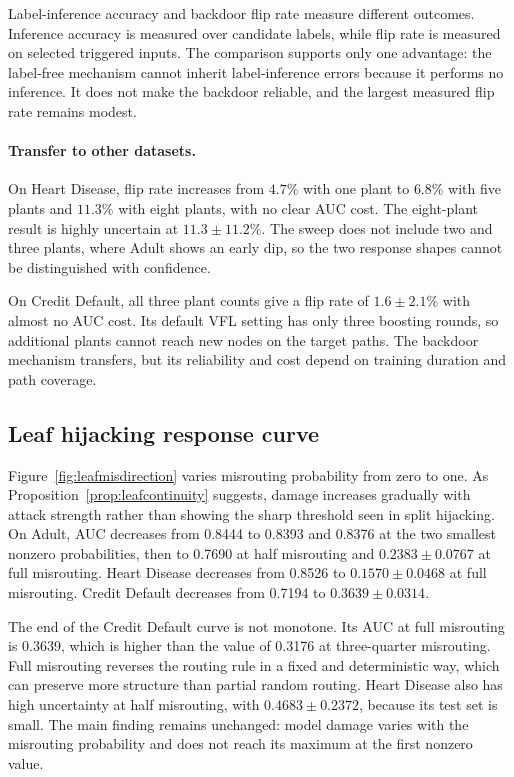 \documentclass[11pt]{article}
\begin{document}
Label-inference accuracy and backdoor flip rate measure different outcomes. Inference accuracy is measured over candidate labels, while flip rate is measured on selected triggered inputs. The comparison supports only one advantage: the label-free mechanism cannot inherit label-inference errors because it performs no inference. It does not make the backdoor reliable, and the largest measured flip rate remains modest.

\paragraph{Transfer to other datasets.}
On Heart Disease, flip rate increases from $4.7\%$ with one plant to $6.8\%$ with five plants and $11.3\%$ with eight plants, with no clear AUC cost. The eight-plant result is highly uncertain at $11.3\pm11.2\%$. The sweep does not include two and three plants, where Adult shows an early dip, so the two response shapes cannot be distinguished with confidence.

On Credit Default, all three plant counts give a flip rate of $1.6\pm2.1\%$ with almost no AUC cost. Its default VFL setting has only three boosting rounds, so additional plants cannot reach new nodes on the target paths. The backdoor mechanism transfers, but its reliability and cost depend on training duration and path coverage.

\FloatBarrier

\subsection{Leaf hijacking response curve}
\label{sec:leafresults}

Figure~\ref{fig:leafmisdirection} varies misrouting probability from zero to one. As Proposition~\ref{prop:leafcontinuity} suggests, damage increases gradually with attack strength rather than showing the sharp threshold seen in split hijacking. On Adult, AUC decreases from 0.8444 to 0.8393 and 0.8376 at the two smallest nonzero probabilities, then to 0.7690 at half misrouting and $0.2383\pm0.0767$ at full misrouting. Heart Disease decreases from 0.8526 to $0.1570\pm0.0468$ at full misrouting. Credit Default decreases from 0.7194 to $0.3639\pm0.0314$.

The end of the Credit Default curve is not monotone. Its AUC at full misrouting is 0.3639, which is higher than the value of 0.3176 at three-quarter misrouting. Full misrouting reverses the routing rule in a fixed and deterministic way, which can preserve more structure than partial random routing. Heart Disease also has high uncertainty at half misrouting, with $0.4683\pm0.2372$, because its test set is small. The main finding remains unchanged: model damage varies with the misrouting probability and does not reach its maximum at the first nonzero value.
\end{document}
